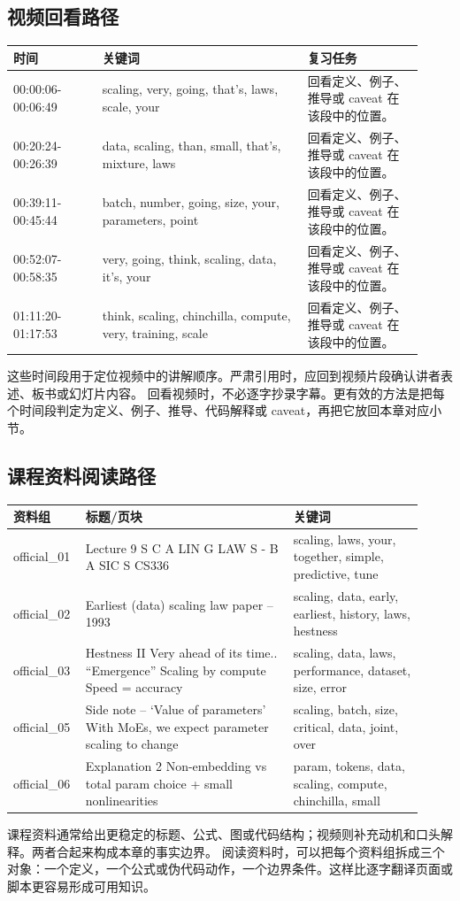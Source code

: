 \documentclass[a4paper]{article}
\begin{document}
\subsection{视频回看路径}
\begin{longtable}{p{0.20\linewidth}p{0.46\linewidth}p{0.26\linewidth}}
\toprule
\textbf{时间} & \textbf{关键词} & \textbf{复习任务}\\
\midrule
00:00:06-00:06:49 & scaling, very, going, that's, laws, scale, your & 回看定义、例子、推导或 caveat 在该段中的位置。\\
00:20:24-00:26:39 & data, scaling, than, small, that's, mixture, laws & 回看定义、例子、推导或 caveat 在该段中的位置。\\
00:39:11-00:45:44 & batch, number, going, size, your, parameters, point & 回看定义、例子、推导或 caveat 在该段中的位置。\\
00:52:07-00:58:35 & very, going, think, scaling, data, it's, your & 回看定义、例子、推导或 caveat 在该段中的位置。\\
01:11:20-01:17:53 & think, scaling, chinchilla, compute, very, training, scale & 回看定义、例子、推导或 caveat 在该段中的位置。\\
\bottomrule
\end{longtable}
这些时间段用于定位视频中的讲解顺序。严肃引用时，应回到视频片段确认讲者表述、板书或幻灯片内容。
回看视频时，不必逐字抄录字幕。更有效的方法是把每个时间段判定为定义、例子、推导、代码解释或 caveat，再把它放回本章对应小节。
\subsection{课程资料阅读路径}
\begin{longtable}{p{0.14\linewidth}p{0.48\linewidth}p{0.30\linewidth}}
\toprule
\textbf{资料组} & \textbf{标题/页块} & \textbf{关键词}\\
\midrule
official\_01 & Lecture 9 S C A LIN G LAW S - B A SIC S CS336 & scaling, laws, your, together, simple, predictive, tune\\
official\_02 & Earliest (data) scaling law paper – 1993 & scaling, data, early, earliest, history, laws, hestness\\
official\_03 & Hestness II Very ahead of its time.. “Emergence” Scaling by compute Speed = accuracy & scaling, data, laws, performance, dataset, size, error\\
official\_05 & Side note – ‘Value of parameters’ With MoEs, we expect parameter scaling to change & scaling, batch, size, critical, data, joint, over\\
official\_06 & Explanation 2 Non-embedding vs total param choice + small nonlinearities & param, tokens, data, scaling, compute, chinchilla, small\\
\bottomrule
\end{longtable}
课程资料通常给出更稳定的标题、公式、图或代码结构；视频则补充动机和口头解释。两者合起来构成本章的事实边界。
阅读资料时，可以把每个资料组拆成三个对象：一个定义，一个公式或伪代码动作，一个边界条件。这样比逐字翻译页面或脚本更容易形成可用知识。
\end{document}

